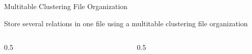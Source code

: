 \documentclass[aspectratio=169, xcolor=dvipsnames]{beamer}
\begin{document}
\begin{frame}{Multitable Clustering File Organization}
    \begin{block}{}
        Store several relations in one file using a multitable clustering file organization
    \end{block}
    \begin{columns}
        \begin{column}{0.5\textwidth}
            \begin{table}[]
                \caption*{department}
                \centering
            \end{table}
            \begin{table}[]
                \caption*{instructor}
                \centering
            \end{table}
        \end{column}
        \begin{column}{0.5\textwidth}
            \begin{table}[]
                \caption*{multitable clustering of department and instructor}
                \centering
\end{table}
\end{column}
\end{columns}
\end{frame}
\end{document}
